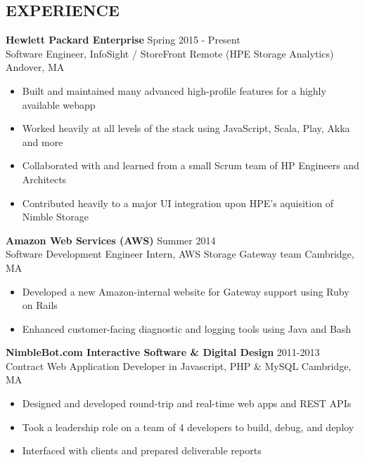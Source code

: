 \documentclass[line,margin]{res}
\begin{document}
\begin{resume}
\section{EXPERIENCE}
    {\large \textbf{Hewlett Packard Enterprise}}
    \hfill Spring 2015 - Present \\
    Software Engineer, InfoSight / StoreFront Remote (HPE Storage Analytics)
    \hfill Andover, MA
    \begin{itemize}  \itemsep -2pt %
        \item Built and maintained many advanced high-profile features for a highly available webapp
        \item Worked heavily at all levels of the stack using JavaScript, Scala, Play, Akka and more
        \item Collaborated with and learned from a small Scrum team of HP Engineers and Architects
        \item Contributed heavily to a major UI integration upon HPE's aquisition of Nimble Storage
    \end{itemize}

    {\large \textbf{Amazon Web Services (AWS)}}
    \hfill Summer 2014 \\
    Software Development Engineer Intern, AWS Storage Gateway team
    \hfill Cambridge, MA
    \begin{itemize}  \itemsep -2pt
        \item Developed a new Amazon-internal website for Gateway support using Ruby on Rails
        \item Enhanced customer-facing diagnostic and logging tools using Java and Bash
    \end{itemize}

    {\large \textbf{NimbleBot.com Interactive Software \& Digital Design}}
    \hfill 2011-2013 \\
    Contract Web Application Developer in Javascript, PHP \& MySQL
    \hfill Cambridge, MA
    \begin{itemize}  \itemsep -2pt %
        \item Designed and developed round-trip and real-time web apps and REST APIs
        \item Took a leadership role on a team of 4 developers to build, debug, and deploy
        \item Interfaced with clients and prepared deliverable reports
    \end{itemize}


\end{resume}
\end{document}
